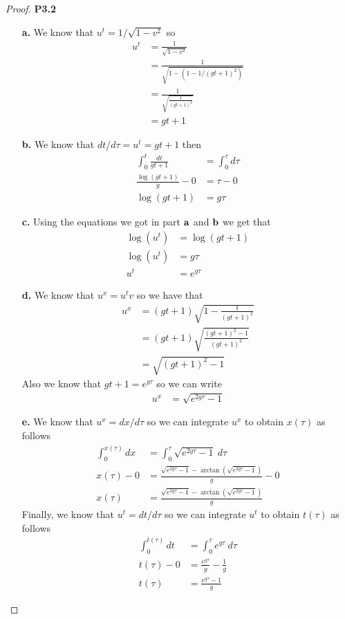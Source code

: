 \documentclass[11pt]{article}
\theoremstyle{definition}
\begin{document}
\cleardoublepage
\begin{proof}{\textbf{P3.2}}
    \begin{itemize}
    \item[\bf{a.}] We know that $u^t = 1/\sqrt{1 - v^2}$ so
    \begin{align*}
        u^t &= \frac{1}{\sqrt{1 - v^2}}\\
        &= \frac{1}{\sqrt{1 - (1 - 1/(gt + 1)^2)}}\\
        &= \frac{1}{\sqrt{\frac{1}{(gt + 1)^2}}}\\
        &= gt + 1
    \end{align*}
    \item[\bf{b.}] We know that $dt/d\tau = u^t = gt + 1$ then
    \begin{align*}
        \int_0^t \frac{dt}{gt + 1} &= \int_0^\tau d\tau\\
        \frac{\log(gt + 1)}{g} - 0 &= \tau - 0\\
        \log(gt + 1) &= g\tau
    \end{align*}
    \item[\bf{c.}] Using the equations we got in part $\bf{a}$ and $\bf{b}$
    we get that
    \begin{align*}
        \log(u^t) &= \log(gt +1)\\
        \log(u^t) &= g\tau\\
        u^t &= e^{g\tau}
    \end{align*}
    \item[\bf{d.}] We know that $u^x = u^t v$ so we have that
    \begin{align*}
        u^x &= (gt + 1)\sqrt{1 - \frac{1}{(gt + 1)^2}}\\
            &= (gt + 1)\sqrt{\frac{(gt + 1)^2 - 1}{(gt + 1)^2}}\\
            &= \sqrt{(gt + 1)^2 - 1}
    \end{align*}
    Also we know that $gt + 1 = e^{g\tau}$ so we can write
    \begin{align*}
        u^x &= \sqrt{e^{2g\tau} - 1}
    \end{align*}
    \item[\bf{e.}] We know that $u^x = dx/d\tau$ so we can integrate $u^x$ to
    obtain $x(\tau)$ as follows
    \begin{align*}
        \int_0^{x(\tau)} dx &= \int_0^\tau \sqrt{e^{2g\tau} - 1}~d\tau\\
        x(\tau) - 0 &= \frac{\sqrt{e^{2g\tau} - 1} - \arctan(\sqrt{e^{2g\tau} - 1})}{g} - 0\\
        x(\tau) &= \frac{\sqrt{e^{2g\tau} - 1} - \arctan(\sqrt{e^{2g\tau} - 1})}{g}
    \end{align*}
    Finally, we know that $u^t = dt/d\tau$ so we can integrate $u^t$ to
    obtain $t(\tau)$ as follows
    \begin{align*}
        \int_0^{t(\tau)} dt &= \int_0^\tau e^{g\tau}~d\tau\\
        t(\tau) - 0 &= \frac{e^{g\tau}}{g} - \frac{1}{g}\\
        t(\tau) &= \frac{e^{g\tau} - 1}{g}
    \end{align*}
\end{itemize}
\end{proof}
\end{document}
